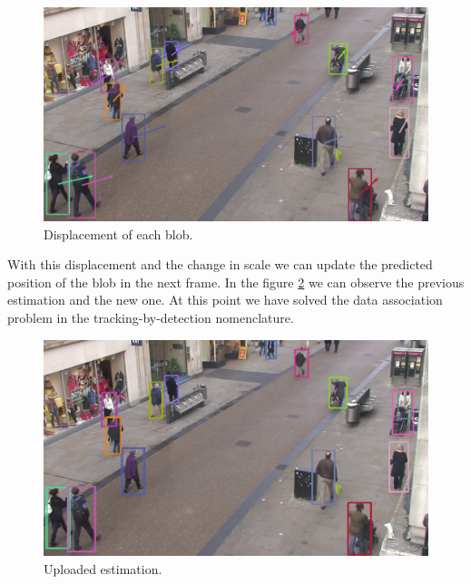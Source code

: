 \begin{figure}[H]
\centering         
\includegraphics[width=\textwidth]{intro/alcover2.png}
\caption{Displacement of each blob.} \label{solution5}
\end{figure}


With this displacement and the change in scale we can update the predicted position of the blob in the next frame. In the figure \ref{solution4} we can observe the previous estimation and the new one. At this point we have solved the data association problem in the tracking-by-detection nomenclature.


\begin{figure}[H]
\centering         
\includegraphics[width=\textwidth]{intro/deteccionsBLOB.jpg}
\caption{Uploaded estimation.} \label{solution4}
\end{figure}



